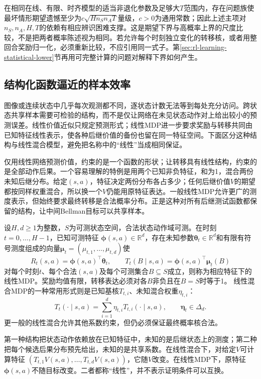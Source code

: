 在相同在线、有限、时齐模型的适当非退化参数及足够大$T$范围内，存在问题族使最坏情形期望遗憾至少为$c\sqrt{Hn_Sn_AT}$量级，$c>0$为通用常数；因此上述主项对$n_S,n_A,H,T$的依赖有相应辨识困难支撑。这是期望下界与高概率上界的尺度比较，不是把两者概率陈述视为相同。若允许每个时刻独立变化的转移核，或者用整回合奖励归一化，必须重新比较，不应引用同一式子。第\ref{sec:rl-learning-statistical-lower}节再用可完整计算的问题对解释下界如何产生。

\subsection{结构化函数逼近的样本效率}
\label{sec:rl-learning-linear-complexity}

图像或连续状态中几乎每次观测都不同，逐状态计数无法等到每处充分访问。跨状态共享样本需要可检验的结构，而不是仅让网络在未见状态动作对上给出较小的预测误差。线性价值近似只规定预测形式；线性MDP进一步要求奖励与转移共同由已知特征线性表示，使各种后继价值的备份也留在同一特征空间。下面区分这种结构与线性混合模型，避免把名称中的“线性”当成相同保证。

仅用线性网络预测价值，约束的是一个函数的形状；让转移具有线性结构，约束的是全部动作后果。一个容易理解的特例是用两个已知非负特征，和为1，混合两份未知后继分布。给定$(s,a)$，特征决定两份分布各占多少；任何后继价值$V$的期望都按同样权重混合，所以换一个$V$仍能用原特征表达。一般线性MDP允许更广的测度表示，但始终要求最终转移是合法概率分布。正是这种对所有后继测试函数都保留的结构，让中间Bellman目标可以共享样本。

\begin{definition}[线性MDP与线性混合MDP]
  \label{def:rl-learning-linear-mdp}
  设$H,d\geq1$为整数，$S$为可测状态空间，合法状态动作域可测。在时刻$t=0,\ldots,H-1$，已知可测特征
  $\bm\phi(s,a)\in\mathbb R^d$，存在未知参数$\bm\theta_t\in\mathbb R^d$和有限有符号测度组成的向量$\bm\mu_t=(\mu_{t,1},\ldots,\mu_{t,d})$使
  \[
    R_t(s,a)=\bm\phi(s,a)^\top\bm\theta_t,\qquad
    T_t(B\mid s,a)=\bm\phi(s,a)^\top\bm\mu_t(B)
  \]
  对每个时刻$t$、每个合法$(s,a)$及每个可测集合$B\subseteq S$成立，则称为相应特征下的线性MDP。奖励均值有限，转移表达必须对各$B$非负且在$B=S$时等于1。
  线性混合MDP的一种常用形式则是已知基核$T_{t,i}$、未知混合权重$\eta_{t,i}$：
  \[
    T_t(\cdot\mid s,a)=\sum_{i=1}^d\eta_{t,i}T_{t,i}(\cdot\mid s,a),
       \qquad \bm\eta_t\in\Delta_d.
  \]
  更一般的线性混合允许其他系数约束，但仍必须保证最终概率核合法。
\end{definition}

第一种结构把状态动作依赖放在已知特征中，未知的是后继状态上的测度；第二种把每个候选后果分布预先给出，未知的是共享系数。在线性混合下，对给定$V$可计算特征
$(T_{t,1}V(s,a),\ldots,T_{t,d}V(s,a))$，它随$V$改变。在线性MDP下，原特征$\bm\phi(s,a)$不随目标改变。二者都称“线性”，并不表示证明条件可以互换。

